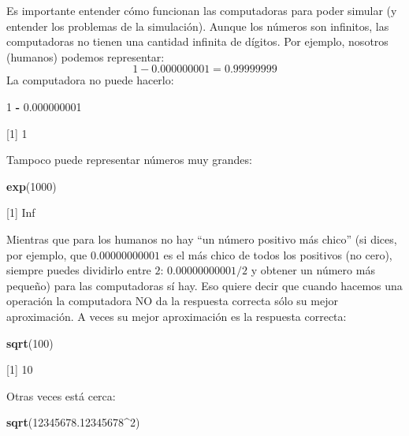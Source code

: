 \documentclass[
]{book}
\newenvironment{Shaded}{\begin{snugshade}}{\end{snugshade}}
\newcommand{\DecValTok}[1]{\textcolor[rgb]{0.00,0.00,0.81}{#1}}
\newcommand{\FloatTok}[1]{\textcolor[rgb]{0.00,0.00,0.81}{#1}}
\newcommand{\KeywordTok}[1]{\textcolor[rgb]{0.13,0.29,0.53}{\textbf{#1}}}
\newcommand{\NormalTok}[1]{#1}
\newcommand{\OperatorTok}[1]{\textcolor[rgb]{0.81,0.36,0.00}{\textbf{#1}}}
\newcommand{\StringTok}[1]{\textcolor[rgb]{0.31,0.60,0.02}{#1}}
\begin{document}
Es importante entender cómo funcionan las computadoras para poder simular (y entender los problemas de la simulación). Aunque los números son infinitos, las computadoras no tienen una cantidad infinita de dígitos. Por ejemplo, nosotros (humanos) podemos representar:
\[
\begin{equation}
1 - 0.000000001 = 0.99999999
\end{equation}
\]
La computadora no puede hacerlo:

\begin{Shaded}
\begin{Highlighting}[]
\DecValTok{1} \OperatorTok{-}\StringTok{ }\FloatTok{0.000000001}
\end{Highlighting}
\end{Shaded}

{[}1{]} 1

Tampoco puede representar números muy grandes:

\begin{Shaded}
\begin{Highlighting}[]
\KeywordTok{exp}\NormalTok{(}\DecValTok{1000}\NormalTok{)}
\end{Highlighting}
\end{Shaded}

{[}1{]} Inf

Mientras que para los humanos no hay ``un número positivo más chico'' (si dices, por ejemplo, que \(0.00000000001\) es el más chico de todos los positivos (no cero), siempre puedes dividirlo entre \(2\): \(0.00000000001/2\) y obtener un número más pequeño) para las computadoras sí hay. Eso quiere decir que cuando hacemos una operación la computadora NO da la respuesta correcta sólo su mejor aproximación. A veces su mejor aproximación es la respuesta correcta:

\begin{Shaded}
\begin{Highlighting}[]
\KeywordTok{sqrt}\NormalTok{(}\DecValTok{100}\NormalTok{)}
\end{Highlighting}
\end{Shaded}

{[}1{]} 10

Otras veces está cerca:

\begin{Shaded}
\begin{Highlighting}[]
\KeywordTok{sqrt}\NormalTok{(}\FloatTok{12345678.12345678}\OperatorTok{^}\DecValTok{2}\NormalTok{)}
\end{Highlighting}
\end{Shaded}
\end{document}

